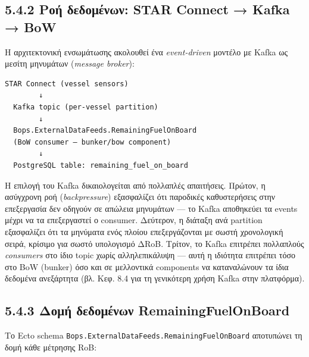 \subsection{5.4.2 Ροή δεδομένων: STAR Connect → Kafka →
BoW}\label{ux3c1ux3bfux3ae-ux3b4ux3b5ux3b4ux3bfux3bcux3adux3bdux3c9ux3bd-star-connect-kafka-bow}

Η αρχιτεκτονική ενσωμάτωσης ακολουθεί ένα \emph{event-driven} μοντέλο με
Kafka ως μεσίτη μηνυμάτων (\emph{message broker}):

\begin{verbatim}
STAR Connect (vessel sensors)
        ↓
  Kafka topic (per-vessel partition)
        ↓
  Bops.ExternalDataFeeds.RemainingFuelOnBoard
  (BoW consumer — bunker/bow component)
        ↓
  PostgreSQL table: remaining_fuel_on_board
\end{verbatim}

Η επιλογή του Kafka δικαιολογείται από πολλαπλές απαιτήσεις. Πρώτον, η
ασύγχρονη ροή (\emph{backpressure}) εξασφαλίζει ότι παροδικές
καθυστερήσεις στην επεξεργασία δεν οδηγούν σε απώλεια μηνυμάτων --- το
Kafka αποθηκεύει τα events μέχρι να τα επεξεργαστεί ο consumer.
Δεύτερον, η διάταξη ανά partition εξασφαλίζει ότι τα μηνύματα ενός
πλοίου επεξεργάζονται με σωστή χρονολογική σειρά, κρίσιμο για σωστό
υπολογισμό ΔRoB. Τρίτον, το Kafka επιτρέπει πολλαπλούς \emph{consumers}
στο ίδιο topic χωρίς αλληλεπικάλυψη --- αυτή η ιδιότητα επιτρέπει τόσο
στο BoW (bunker) όσο και σε μελλοντικά components να καταναλώνουν τα
ίδια δεδομένα ανεξάρτητα (βλ. Κεφ. 8.4 για τη γενικότερη χρήση Kafka
στην πλατφόρμα).

\subsection{5.4.3 Δομή δεδομένων
RemainingFuelOnBoard}\label{ux3b4ux3bfux3bcux3ae-ux3b4ux3b5ux3b4ux3bfux3bcux3adux3bdux3c9ux3bd-remainingfuelonboard}

Το Ecto schema \texttt{Bops.ExternalDataFeeds.RemainingFuelOnBoard}
αποτυπώνει τη δομή κάθε μέτρησης RoB:

